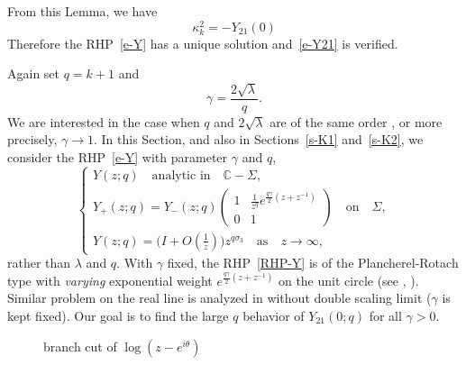 \documentclass{amsart}
\theoremstyle{definition}
\theoremstyle{remark}
\numberwithin{equation}{section}
\newcommand{\C}{\mathbb C}
\begin{document}
From this Lemma,  we have
\begin{equation}
  \kappa^2_{k}=-Y_{21}(0)
\end{equation}
Therefore the RHP~\eqref{e-Y} has a unique solution 
and~\eqref{e-Y21} is verified.


\bigskip
Again set $q=k+1$ and 
\begin{equation}
  \gamma=\frac{2\sqrt{\lambda}}{q}.
\end{equation}
We are interested in the case when $q$ and $2\sqrt{\lambda}$ 
are of the same order
, or more precisely, $\gamma\to 1$.
In this Section, and also in Sections~\ref{s-K1} and~\ref{s-K2}, we consider 
the RHP~\eqref{e-Y} with parameter $\gamma$ and $q$, 
\begin{equation}\label{RHP-Y}
  \begin{cases}
     Y(z;q) \quad \text{analytic in} \quad  \C -\Sigma,\\
     Y_+(z;q)=Y_-(z;q)
\begin{pmatrix}1&\frac{1}{z^q}e^{\frac{q\gamma}{2}(z+z^{-1})}\\0&1
\end{pmatrix} \quad\text{on}\quad \Sigma,\\
     Y(z;q)=\bigl( I+O(\frac1z) \bigr)z^{q\sigma_3} 
\quad\text{as}\quad z\rightarrow \infty,
  \end{cases}
\end{equation}
rather than $\lambda$ and $q$.
With $\gamma$ fixed, the RHP~\eqref{RHP-Y} is of the Plancherel-Rotach type  
with \emph{varying} exponential weight 
$e^{\frac{q\gamma}{2}(z+z^{-1})}$ on the unit circle 
(see \cite{Sz}, \cite{DKMVZ}).
Similar problem on the real line is analyzed in \cite{DKMVZ} 
without double scaling limit ($\gamma$ is kept fixed).
Our goal is to find the large $q$ behavior of $Y_{21}(0;q)$ for all $\gamma > 0$.
\begin{figure}[ht]
 \centerline{}
 \caption{branch cut of $\log (z-e^{i\theta})$}\label{fig-branch}
\end{figure}
\end{document}
